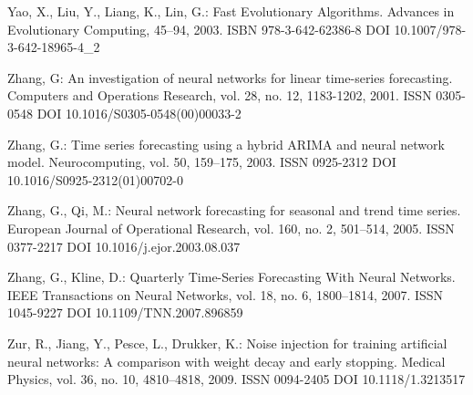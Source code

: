 \begin{thebibliography}{99.}
 Yao, X., Liu, Y., Liang, K., Lin, G.: Fast Evolutionary Algorithms. Advances in Evolutionary Computing, 45--94, 2003. ISBN 978-3-642-62386-8 DOI 10.1007/978-3-642-18965-4\_2

 Zhang, G: An investigation of neural networks for linear time-series forecasting. Computers and Operations Research, vol. 28, no. 12, 1183-1202, 2001. ISSN 0305-0548 DOI 10.1016/S0305-0548(00)00033-2

 Zhang, G.: Time series forecasting using a hybrid ARIMA and neural network model. Neurocomputing, vol. 50, 159--175, 2003. ISSN 0925-2312 DOI 10.1016/S0925-2312(01)00702-0

 Zhang, G., Qi, M.: Neural network forecasting for seasonal and trend time series. European Journal of Operational Research, vol. 160, no. 2, 501--514, 2005. ISSN 0377-2217 DOI 10.1016/j.ejor.2003.08.037

 Zhang, G., Kline, D.: Quarterly Time-Series Forecasting With Neural Networks. IEEE Transactions on Neural Networks, vol. 18, no. 6, 1800--1814, 2007. ISSN 1045-9227 DOI 10.1109/TNN.2007.896859

 Zur, R., Jiang, Y., Pesce, L., Drukker, K.: Noise injection for training artificial neural networks: A comparison with weight decay and early stopping. Medical Physics, vol. 36, no. 10, 4810--4818, 2009. ISSN 0094-2405 DOI 10.1118/1.3213517

\end{thebibliography}
